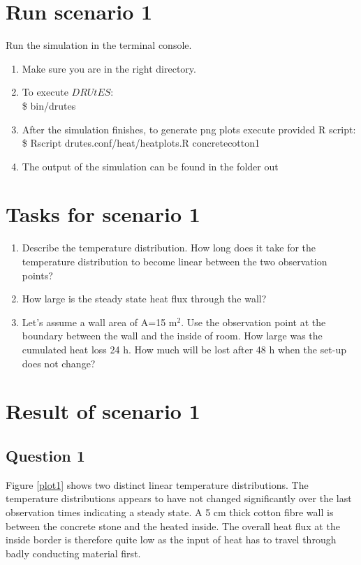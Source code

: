 \section*{Run scenario 1}
Run the simulation in the terminal console.
\begin{enumerate}
\item Make sure you are in the right directory. 
\item To execute $DRUtES$: \\
\$ bin/drutes
\item After the simulation finishes, to generate png plots execute provided R script: \\
\$ Rscript drutes.conf/heat/heatplots.R concretecotton1
\item The output of the simulation can be found in the folder out

\end{enumerate}

\section*{Tasks for scenario 1}

\begin{enumerate}
\item Describe the temperature distribution. How long does it take for the temperature distribution to become linear between the two observation points?
\item How large is the steady state heat flux through the wall?
\item Let's assume a wall area of A=15 m$^2$. Use the observation point at the boundary between the wall and the inside of room. How large was the cumulated heat loss 24 h. How much will be lost after 48 h when the set-up does not change?
\end{enumerate}


\section*{Result of scenario 1}

\subsection*{Question 1}
Figure \ref{plot1} shows two distinct linear temperature distributions. The temperature distributions appears to have not changed significantly over the last observation times indicating a steady state. A 5 cm thick cotton fibre wall is between the concrete stone and the heated inside. The overall heat flux at the inside border is therefore quite low as the input of heat has to travel through badly conducting material first. 

